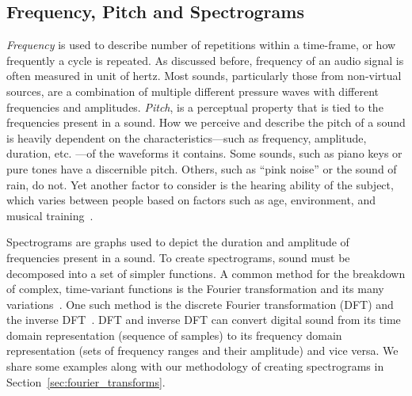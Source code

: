 \documentclass[\main/thesis.tex]{subfiles}
\begin{document}
\subsection{Frequency, Pitch and Spectrograms}
\textit{Frequency} is used to describe number of repetitions within a time-frame, or how frequently a cycle is repeated. As discussed before, frequency of an audio signal is often measured in unit of hertz. Most sounds, particularly those from non-virtual sources, are a combination of multiple different pressure waves with different frequencies and amplitudes. \textit{Pitch}, is a perceptual property that is tied to the frequencies present in a sound. How we perceive and describe the pitch of a sound is heavily dependent on the characteristics---such as frequency, amplitude, duration, etc. ---of the waveforms it contains. Some sounds, such as piano keys or pure tones have a discernible pitch. Others, such as \enquote{pink noise} or the sound of rain, do not. Yet another factor to consider is the hearing ability of the subject, which varies between people based on factors such as age, environment, and musical training~\cite{reiss2016meta,alain2007age,newman2012grm7}. 

Spectrograms are graphs used to depict the duration and amplitude of frequencies present in a sound. To create spectrograms, sound must be decomposed into a set of simpler functions. A common method for the breakdown of complex, time-variant functions is the Fourier transformation and its many variations~\cite{cochran1967fast}. One such method is the discrete Fourier transformation (DFT) and the inverse DFT~\cite{cochran1967fast,griffin1984signal,nawab1983signal}. DFT and inverse DFT can convert digital sound from its time domain representation (sequence of samples) to its frequency domain representation (sets of frequency ranges and their amplitude) and vice versa. We share some examples along with our methodology of creating spectrograms in Section~\ref{sec:fourier_transforms}.\\\\


\end{document}
